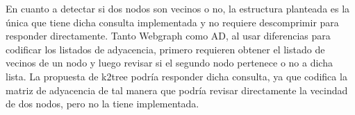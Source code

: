  
% 




En cuanto a detectar si dos nodos son vecinos o no, la estructura planteada es la única que tiene dicha consulta implementada y no requiere descomprimir para responder directamente. Tanto Webgraph como AD, al usar diferencias para codificar los listados de adyacencia, primero requieren obtener el listado de vecinos de un nodo y luego revisar si el segundo nodo pertenece o no a dicha lista. La propuesta de k2tree podría responder dicha consulta, ya que codifica la matriz de adyacencia de tal manera que podría revisar directamente la vecindad de dos nodos, pero no la tiene implementada.
